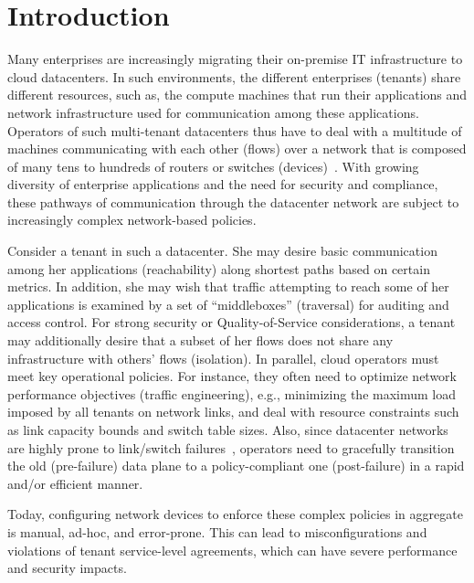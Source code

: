 \section{Introduction}

Many enterprises are increasingly migrating their on-premise IT
infrastructure to cloud datacenters. In such environments, the
different enterprises (tenants) share different resources, such as,
the compute machines that run their applications and network
infrastructure used for communication among these applications.
Operators of such multi-tenant datacenters thus have to deal with a
multitude of machines communicating with each other (flows) over a
network that is composed of many tens to hundreds of routers or
switches (devices)~\cite{mpa-imc15}. With growing diversity of
enterprise applications and the need for security and compliance,
these pathways of communication through the datacenter network are
subject to increasingly complex network-based policies.

Consider a tenant in such a datacenter. She may desire
basic communication among her applications (reachability) along
shortest paths based on certain metrics. In addition, she may wish
that traffic attempting to reach some of her applications is examined
by a set of ``middleboxes'' (traversal) for auditing and access control. 
For strong security or Quality-of-Service considerations,
a tenant may additionally desire that a subset of her
flows does not share any infrastructure with others' flows (isolation).  
In parallel,
cloud operators must meet key operational policies. For instance, they
often need to optimize network performance objectives (traffic
engineering), e.g., minimizing the maximum load imposed by all tenants
on network links, and deal with resource constraints such as link
capacity bounds and switch table sizes. Also, since datacenter
networks are highly prone to link/switch
failures~\cite{datacenterfailures}, operators need to gracefully
transition the old (pre-failure) data plane to a policy-compliant one
(post-failure) in a rapid and/or efficient manner.

Today, configuring network devices to enforce these complex policies
in aggregate is manual, ad-hoc, and error-prone.  This
can lead to misconfigurations and violations of tenant service-level
agreements, which can have severe performance and security
impacts.

